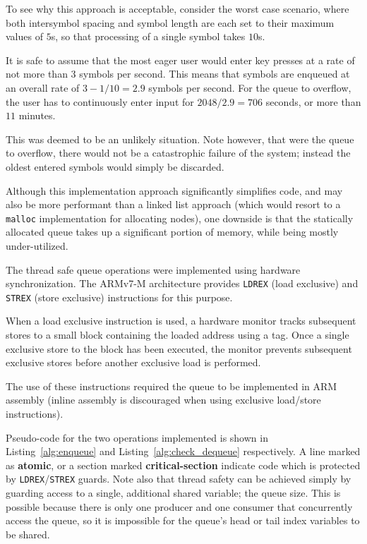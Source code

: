 \documentclass[11pt,a4paper,twocolumn]{scrartcl}
\begin{document}
To see why this approach is acceptable, consider the worst case scenario, where both intersymbol spacing and symbol length are each set to their maximum values of $5$s, so that processing of a single symbol takes $10$s. 

It is safe to assume that the most eager user would enter key presses at a rate of not more than $3$ symbols per second. This means that symbols are enqueued at an overall rate of $3 - 1/10 = 2.9$ symbols per second. For the queue to overflow, the user has to continuously enter input for $2048/2.9 = 706$ seconds, or more than $11$ minutes.

This was deemed to be an unlikely situation. Note however, that were the queue to overflow, there would not be a catastrophic failure of the system; instead the oldest entered symbols would simply be discarded.

Although this implementation approach significantly simplifies code, and may also be more performant than a linked list approach (which would resort to a \verb!malloc! implementation for allocating nodes), one downside is that the statically allocated queue takes up a significant portion of memory, while being mostly under-utilized.

The thread safe queue operations were implemented using hardware synchronization. The ARMv7-M architecture provides \verb!LDREX! (load exclusive) and \verb!STREX! (store exclusive) instructions for this purpose.

When a load exclusive instruction is used, a hardware monitor tracks subsequent stores to a small block containing the loaded address using a tag. Once a single exclusive store to the block has been executed, the monitor prevents subsequent exclusive stores before another exclusive load is performed.\cite{armv7_m_architecture_manual}

The use of these instructions required the queue to be implemented in ARM assembly (inline assembly is discouraged when using exclusive load/store instructions).

Pseudo-code for the two operations implemented is shown in Listing~\ref{alg:enqueue} and Listing~\ref{alg:check_dequeue} respectively. A line marked as \textbf{atomic}, or a section marked \textbf{critical-section} indicate code which is protected by \verb!LDREX!/\verb!STREX! guards. Note also that thread safety can be achieved simply by guarding access to a single, additional shared variable; the queue size. This is possible because there is only one producer and one consumer that concurrently access the queue, so it is impossible for the queue's head or tail index variables to be shared.
\end{document}
